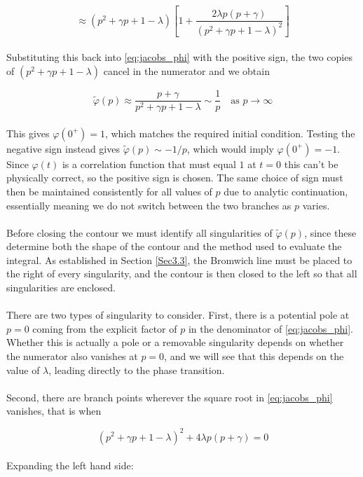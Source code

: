 \begin{equation}
    \approx (p^2+\gamma p+1-\lambda)
    \left[1 + \frac{2\lambda p(p+\gamma)}{(p^2+\gamma p+1-\lambda)^2}\right]
\end{equation}
\\
Substituting this back into \eqref{eq:jacobs_phi} with the positive sign, the 
two copies of $(p^2 + \gamma p + 1 - \lambda)$ cancel in the numerator and we 
obtain

\begin{equation}
    \tilde{\varphi}(p) \approx \frac{p + \gamma}{p^2 + \gamma p + 1 - \lambda}
    \sim \frac{1}{p} \quad \text{as } p \to \infty
\end{equation}
\\
This gives $\varphi(0^+) = 1$, which matches the required initial condition. 
Testing the negative sign instead gives $\tilde{\varphi}(p) \sim -1/p$, which 
would imply $\varphi(0^+) = -1$. Since $\varphi(t)$ is a correlation function 
that must equal $1$ at $t = 0$ this can't be physically correct, so the positive sign 
is chosen. The same choice of sign must then be maintained consistently for all 
values of $p$ due to analytic continuation, essentially meaning we do not switch between the two 
branches as $p$ varies.
\\
\\
Before closing the contour we must identify all singularities of $\tilde{\varphi}(p)$, 
since these determine both the shape of the contour and the method used to evaluate 
the integral. As established in Section \ref{Sec3.3}, the Bromwich line must be placed to 
the right of every singularity, and the contour is then closed to the left so that 
all singularities are enclosed.
\\
\\
There are two types of singularity to consider. First, there is a potential pole 
at $p = 0$ coming from the explicit factor of $p$ in the denominator of 
\eqref{eq:jacobs_phi}. Whether this is actually a pole or a removable singularity 
depends on whether the numerator also vanishes at $p = 0$, and we will see that 
this depends on the value of $\lambda$, leading directly to the phase 
transition.
\\
\\
Second, there are branch points wherever the square root in \eqref{eq:jacobs_phi} 
vanishes, that is when

\begin{equation}
    (p^2 + \gamma p + 1 - \lambda)^2 + 4\lambda p(p+\gamma) = 0
\end{equation}
\\
Expanding the left hand side:

